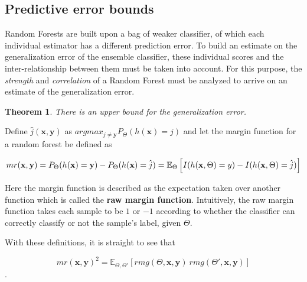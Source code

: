 \documentclass{article}%
\newcommand{\Expect}{{\mathbb{E}}}
\newtheorem{theorem}{Theorem}[section]
\newtheorem{lemma}[theorem]{Lemma}
\theoremstyle{definition}
\begin{document}
\subsection{Predictive error bounds}

Random Forests are built upon a bag of weaker classifier, of which each individual estimator has a different prediction error. To build an estimate on the generalization error of the ensemble classifier, these individual scores and the inter-relationship between them must be taken into account. For this purpose, the \textit{strength} and \textit{correlation} of a Random Forest must be analyzed to arrive on an estimate of the generalization error.


\begin{theorem}
	There is an upper bound for the generalization error.
\end{theorem}

Define $\hat{j}(\textbf{x},\textbf{y})$ as $arg max_{j\neq \textbf{y}} P_{\Theta}(h(\textbf{x}) = j)$ and let the margin function for a random forest be defined as

\begin{equation}\label{eq:rf-marginFunRf}
mr(\textbf{x},\textbf{y}) =  P_{\Theta}(h(\textbf{x}) = \textbf{y}) - P_{\Theta}(h(\textbf{x}) = \hat{j}) 
\\ 
= \Expect_{\Theta} \left[  I(h(\textbf{x},\Theta ) = y ) - I( h( \textbf{x},\Theta ) = \hat{j} )  \right]
\end{equation} 




Here the margin function is described as the expectation taken over another function which is called the \textbf{raw margin function}\label{eq:rf-rawMarginFun}. Intuitively, the raw margin function takes each sample to be $1$ or $-1$ according to whether the classifier can correctly classify or not the sample's label, given $\Theta$.

With these definitions, it is straight to see that 

$$mr( \textbf{x},\textbf{y} )^2 = \Expect_{\Theta, \Theta'} \left[ rmg( \Theta,\textbf{x},\textbf{y} ) \ rmg(\Theta',\textbf{x},\textbf{y} )  \right] $$.
\end{document}
